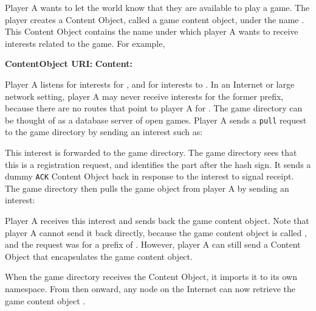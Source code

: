 \documentclass[a4paper,12pt]{report}      %
\begin{document}
Player A wants to let the world know that they are available to play a game. The player creates a
Content Object, called a game content object, under the name \texttt{}. This Content Object contains the name under which player A wants to receive interests related to the game. For example,\newline

\noindent\textbf{ContentObject URI:} \texttt{}\newline
\textbf{Content:} \texttt{}\newline

Player A listens for interests for \texttt{}, and for interests to
\texttt{}. In an Internet or large network setting, player A may never
receive interests for the former prefix, because there are no routes that point to player A for
\texttt{}. The game directory can be thought of as a
database server of open games. Player A sends a \verb!pull! request to the game directory by sending an
interest such as:
\texttt{}

This interest is forwarded to the game directory. The game directory sees that this is a registration
request, and identifies the part after the hash sign. It sends a dummy \verb!ACK! Content Object back in
response to the interest to signal receipt. The game directory then pulls the game object from
player A by sending an interest: \texttt{}

Player A receives this interest and sends back the game content object. Note that player A cannot send it
back directly, because the game content object is called \texttt{}, 
and the request was for a prefix of \texttt{}. However, player A can still
send a Content Object that encapsulates the game content object.

When the game directory receives the Content Object, it imports it to its own namespace. From then
onward, any node on the Internet can now retrieve the game content object
\texttt{}.
\end{document}
